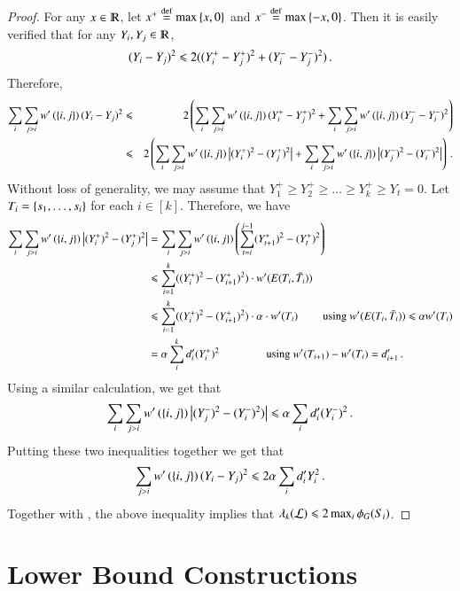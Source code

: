 \documentclass[11pt]{article}
\begin{document}
\begin{proof}
For any $x \in \R$, let $x^+ \stackrel{\textup{def}}{=} \max \left\{x,0\right\}$ and $x^- \stackrel{\textup{def}}{=} \max \left\{-x,0\right\}$.
Then it is easily verified that for any $Y_i, Y_j \in \R$,
\[ (Y_i - Y_j)^2 \leqslant   2( (Y_i^+ - Y_j^+)^2 + (Y_i^- - Y_j^-)^2 ) \,. \]
Therefore,
\begin{eqnarray*}
\sum_{i} \sum_{j>i} w' \left(\left\{i,j\right\} \right ) (Y_i - Y_j)^2 & \leqslant & 
2 \left( \sum_{i} \sum_{j>i} w' \left(\left\{i,j\right\} \right ) (Y_i^+ - Y_j^+)^2  + \sum_{i} \sum_{j>i} w' \left(\left\{i,j\right\} \right ) (Y_j^- - Y_i^-)^2  \right ) \\
 & \leqslant & 2 \left(\sum_{i} \sum_{j>i} w' \left(\left\{i,j\right\} \right ) \left\lvert(Y_i^+)^2 - (Y_j^+)^2\right\rvert  
	+ \sum_{i} \sum_{j>i} w' \left(\left\{i,j\right\} \right ) \left\lvert(Y_j^-)^2 - (Y_i^-)^2\right\rvert  \right ) \,.
\end{eqnarray*}
Without loss of generality, we may assume that $Y_1^+ \geq Y_2^+ \geq \ldots \geq Y_k^+ \geq Y_t = 0$.  Let $T_i = \left\{s_1, \ldots, s_i\right\}$ for each $i \in [k]$.
Therefore, we have
\begin{align*}
 \sum_{i} \sum_{j>i} w' \paren{\set{i,j}} \abs{(Y_i^+)^2 - (Y_j^+)^2}
 & = \sum_{i} \sum_{j>i} w' \paren{\set{i,j}} \left(\sum_{t=i}^{j-1}
 (Y_{t+1}^+)^2 -(Y_t^+)^2 \right) \\
 &\leq \sum_{i=1}^{k}( (Y_i^+)^2 - (Y_{i+1}^+)^2 )  \cdot w'( E(T_i, \bar{T_i})) \\
& \leq   \sum_{i=1}^{k}( (Y_i^+)^2 - (Y_{i+1}^+)^2 ) \cdot  \alpha
\cdot  w'(T_i) \qquad \textrm{ using } w'( E(T_i, \bar{T_i})) \leq \alpha w'(T_i) \\
%
& = \alpha \sum_{i}^k d_i' (Y_i^+)^2 \qquad \qquad \textrm{ using } w'(T_{i+1}) - w'(T_i) = d_{i+1}'\mper 
\end{align*}
Using a similar calculation, we get that
$$ \sum_{i} \sum_{j>i} w' \left(\left\{i,j\right\} \right ) \left\lvert(Y_j^-)^2 - (Y_i^-)^2)\right\rvert \leqslant
\alpha \sum_{i}d_i' (Y_i^-)^2 \,. $$
Putting these two inequalities together we get that 
$$ \sum_{j>i} w' \left(\left\{i,j\right\} \right ) (Y_i - Y_j)^2 \leqslant  2 \alpha
\sum_{i}d_i' Y_i^2 \,.$$
Together with , the above inequality implies that  $\lambda_{k}(\mathcal L) \leqslant 2 \max_i \phi_G(S_i)$.
\end{proof}





\section{Lower Bound Constructions}
\label{sec:lowerbounds}
\end{document}
